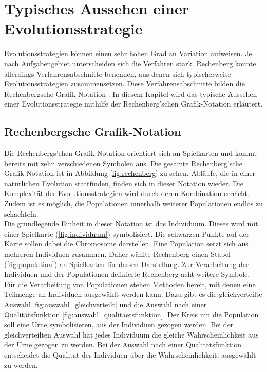 \section{Typisches Aussehen einer Evolutionsstrategie}
Evolutionsstrategien können einen sehr hohen Grad an Variation aufweisen. Je nach Aufgabengebiet unterscheiden sich die Verfahren stark.
Rechenberg konnte allerdings Verfahrensabschnitte benennen, aus denen sich typischerweise Evolutionsstrategien zusammensetzen.
Diese Verfahrensabschnitte bilden die Rechenbergsche Grafik-Notation \cite[S.144-146]{schoeneburg}. In diesem Kapitel wird das typische Aussehen einer Evolutionsstrategie mithilfe der Rechenberg'schen Grafik-Notation erläutert.

\subsection{Rechenbergsche Grafik-Notation}
Die Rechenbergs'chen Grafik-Notation orientiert sich an Spielkarten und kommt bereits mit zehn verschiedenen Symbolen aus.
Die gesamte Rechenberg'sche Grafik-Notation ist in Abbildung \ref{fig:rechenberg} zu sehen. Abläufe, die in einer natürlichen Evolution stattfinden, finden sich in dieser Notation wieder.
Die Komplexität der Evolutionsstrategien wird durch deren Kombination erreicht. Zudem ist es möglich, die Populationen innerhalb weiterer Populationen endlos zu schachteln.\\
Die grundlegende Einheit in dieser Notation ist das Individuum. Dieses wird mit einer Spielkarte (\ref{fig:individuum}) symbolisiert. Die schwarzen Punkte auf der Karte sollen dabei die Chromosome darstellen.
Eine Population setzt sich aus mehreren Individuen zusammen. Daher wählte Rechenberg einen Stapel (\ref{fig:population}) an Spielkarten für dessen Darstellung. Zur Verarbeitung der Individuen und der Populationen definierte Rechenberg acht weitere Symbole.
Für die Verarbeitung von Populationen stehen Methoden bereit, mit denen eine Teilmenge an Individuen ausgewählt werden kann. Dazu gibt es die gleichverteilte Auswahl \ref{fig:auswahl_gleichverteilt} und die Auswahl nach einer Qualitätsfunktion \ref{fig:auswahl_qualitaetsfunktion}.
Der Kreis um die Population soll eine Urne symbolisieren, aus der Individuen gezogen werden. Bei der gleichverteilten Auswahl hat jedes Individuum die gleiche Wahrscheinlichkeit aus der Urne gezogen zu werden. Bei der Auswahl nach einer Qualitätsfunktion entscheidet die Qualität der Individuen über die Wahrscheinlichkeit, ausgewählt zu werden.
